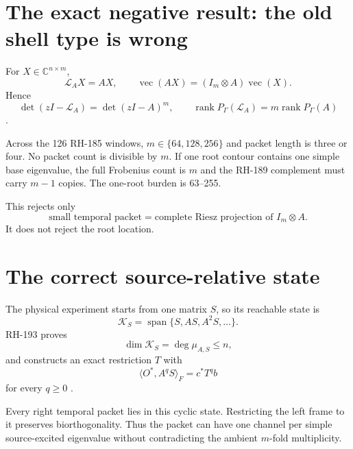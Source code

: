 \documentclass[12pt]{article}
\theoremstyle{remark}
\begin{document}
\section{The exact negative result: the old shell type is wrong}

For $X\in\mathbb C^{n\times m}$,
\begin{equation}\label{eq:left-action}
 \mathcal L_AX=AX,
 \qquad
 \operatorname{vec}(AX)=(I_m\otimes A)\operatorname{vec}(X).
\end{equation}
Hence
\begin{equation}\label{eq:multiplicity}
 \det(zI-\mathcal L_A)=\det(zI-A)^m,
 \qquad
 \operatorname{rank}P_\Gamma(\mathcal L_A)
 =m\operatorname{rank}P_\Gamma(A)
\end{equation}
\citep{WangRH192}.

Across the 126 RH-185 windows, $m\in\{64,128,256\}$ and packet length is
three or four.  No packet count is divisible by $m$.  If one root contour
contains one simple base eigenvalue, the full Frobenius count is $m$ and the
RH-189 complement must carry $m-1$ copies.  The one-root burden is 63--255.

This rejects only
\begin{equation*}
 \text{small temporal packet}
 =\text{complete Riesz projection of }I_m\otimes A.
\end{equation*}
It does not reject the root location.

\section{The correct source-relative state}

The physical experiment starts from one matrix $S$, so its reachable state is
\begin{equation}\label{eq:cyclic}
 \mathcal K_S=\operatorname{span}\{S,AS,A^2S,\ldots\}.
\end{equation}
RH-193 proves
\begin{equation}\label{eq:cyclic-dim}
 \dim\mathcal K_S=\deg\mu_{A,S}\le n,
\end{equation}
and constructs an exact restriction $T$ with
\begin{equation}\label{eq:moments}
 \langle O^*,A^qS\rangle_F=c^*T^qb
\end{equation}
for every $q\ge0$ \citep{WangRH193}.

Every right temporal packet lies in this cyclic state.  Restricting the left
frame to it preserves biorthogonality.  Thus the packet can have one channel
per simple source-excited eigenvalue without contradicting the ambient
$m$-fold multiplicity.
\end{document}
